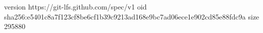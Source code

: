version https://git-lfs.github.com/spec/v1
oid sha256:e5401c8a7f123cf8be6cf1b39c9213ad168e9bc7ad06ece1e902cd85e88fdc9a
size 295880
